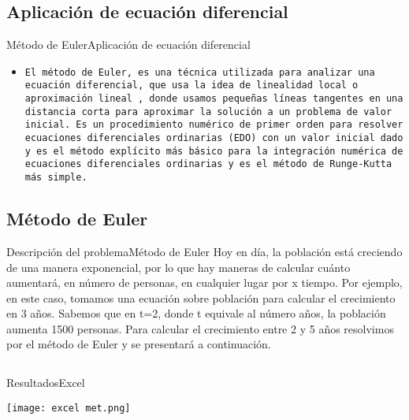 \documentclass[10pt,xcolor={dvipsnames}]{beamer}
\begin{document}
\subsection{Aplicación de ecuación diferencial}
\begin{frame}{Método de Euler}{Aplicación de ecuación diferencial}

\begin{block}{}

  \begin{itemize}
    \item {\tt El método de Euler, es una técnica utilizada para analizar una ecuación diferencial, que usa la idea de linealidad local o aproximación lineal , donde usamos pequeñas líneas tangentes en una distancia corta para aproximar la solución a un problema de valor inicial. Es un procedimiento numérico de primer orden para resolver ecuaciones diferenciales ordinarias (EDO) con un valor inicial dado y es el método explícito más básico para la integración numérica de ecuaciones diferenciales ordinarias y es el método de Runge-Kutta más simple. 
}
   
  \end{itemize}
\end{block}
\end{frame}

\subsection{Método de Euler}
\begin{frame}{Descripción del problema}{Método de Euler}
  Hoy en día, la población está creciendo de una manera exponencial, por lo que hay maneras de calcular cuánto aumentará, en número de personas, en cualquier lugar por x tiempo. Por ejemplo, en este caso, tomamos una ecuación sobre población para calcular el crecimiento en 3 años. Sabemos que en t=2, donde t equivale al número años, la población aumenta 1500 personas. Para calcular el crecimiento entre 2 y 5 años resolvimos por el método de Euler y se presentará a continuación. 

  
\end{frame}
     

\subsection{}
\begin{frame}{Resultados}{Excel}

  
  \texttt{[image: excel met.png]}
  \item
  \caption {Figura 1. Resultados en Excel}
  
\end{frame}
\end{document}
